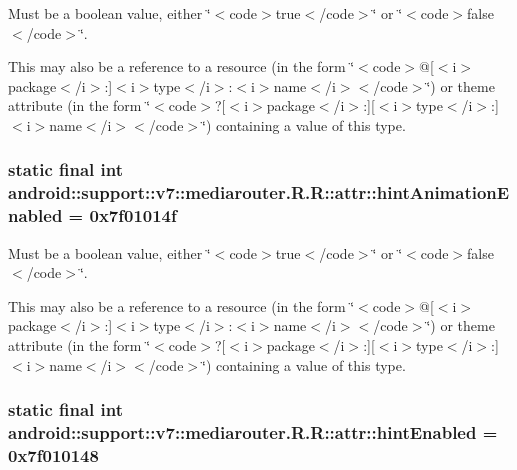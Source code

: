 Must be a boolean value, either \char`\"{}$<$code$>$true$<$/code$>$\char`\"{} or \char`\"{}$<$code$>$false$<$/code$>$\char`\"{}. 

This may also be a reference to a resource (in the form \char`\"{}$<$code$>$@\mbox{[}$<$i$>$package$<$/i$>$:\mbox{]}$<$i$>$type$<$/i$>$:$<$i$>$name$<$/i$>$$<$/code$>$\char`\"{}) or theme attribute (in the form \char`\"{}$<$code$>$?\mbox{[}$<$i$>$package$<$/i$>$:\mbox{]}\mbox{[}$<$i$>$type$<$/i$>$:\mbox{]}$<$i$>$name$<$/i$>$$<$/code$>$\char`\"{}) containing a value of this type. \hypertarget{classandroid_1_1support_1_1v7_1_1mediarouter_1_1_r_1_1attr_938fe2072c8f0709f1d770b629a1fcfe}{
\subsubsection[{hintAnimationEnabled}]{\setlength{\rightskip}{0pt plus 5cm}static final int android::support::v7::mediarouter.R.R::attr::hintAnimationEnabled = 0x7f01014f}}
\label{classandroid_1_1support_1_1v7_1_1mediarouter_1_1_r_1_1attr_938fe2072c8f0709f1d770b629a1fcfe}


Must be a boolean value, either \char`\"{}$<$code$>$true$<$/code$>$\char`\"{} or \char`\"{}$<$code$>$false$<$/code$>$\char`\"{}. 

This may also be a reference to a resource (in the form \char`\"{}$<$code$>$@\mbox{[}$<$i$>$package$<$/i$>$:\mbox{]}$<$i$>$type$<$/i$>$:$<$i$>$name$<$/i$>$$<$/code$>$\char`\"{}) or theme attribute (in the form \char`\"{}$<$code$>$?\mbox{[}$<$i$>$package$<$/i$>$:\mbox{]}\mbox{[}$<$i$>$type$<$/i$>$:\mbox{]}$<$i$>$name$<$/i$>$$<$/code$>$\char`\"{}) containing a value of this type. \hypertarget{classandroid_1_1support_1_1v7_1_1mediarouter_1_1_r_1_1attr_35ddd4804f1fece8814f3d4681f43895}{
\subsubsection[{hintEnabled}]{\setlength{\rightskip}{0pt plus 5cm}static final int android::support::v7::mediarouter.R.R::attr::hintEnabled = 0x7f010148}}
\label{classandroid_1_1support_1_1v7_1_1mediarouter_1_1_r_1_1attr_35ddd4804f1fece8814f3d4681f43895}


